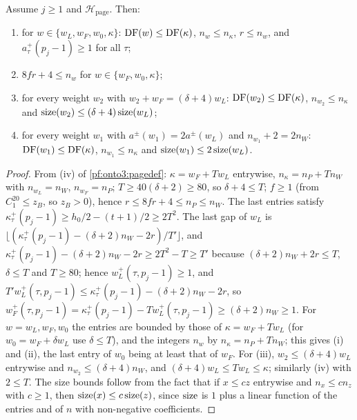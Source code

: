 \begin{lemma}\label{pf:onto3:below}
Assume $j\ge1$ and $\mathcal H_{\mathrm{page}}$. Then:
\begin{enumerate}[label=(\roman*)]
\item for $w\in\{w_L,w_F,w_0,\kappa\}$: $\operatorname{DF}(w)\le\operatorname{DF}(\kappa)$, $n_w\le n_\kappa$, $r\le n_w$, and
$a^+_\tau(p_j-1)\ge1$ for all $\tau$;
\item $8fr+4\le n_w$ for $w\in\{w_F,w_0,\kappa\}$;
\item for every weight $w_2$ with $w_2+w_F=(\delta+4)w_L$: $\operatorname{DF}(w_2)\le\operatorname{DF}(\kappa)$, $n_{w_2}\le n_\kappa$
and $\operatorname{size}(w_2)\le(\delta+4)\operatorname{size}(w_L)$;
\item for every weight $w_1$ with $a^\pm(w_1)=2a^\pm(w_L)$ and $n_{w_1}+2=2n_W$: $\operatorname{DF}(w_1)\le\operatorname{DF}(\kappa)$,
$n_{w_1}\le n_\kappa$ and $\operatorname{size}(w_1)\le2\operatorname{size}(w_L)$.
\end{enumerate}
\end{lemma}

\begin{proof}
From (iv) of \cref{pf:onto3:pagedef}: $\kappa=w_F+Tw_L$ entrywise, $n_\kappa=n_P+Tn_W$ with $n_{w_L}=n_W$, $n_{w_F}=n_P$;
$T\ge40(\delta+2)\ge80$, so $\delta+4\le T$; $f\ge1$ (from $C_1^{20}\le z_B$, so $z_B>0$), hence $r\le8fr+4\le n_P\le n_W$.
The last entries satisfy $\kappa^+_\tau(p_j-1)\ge h_0/2-(t+1)/2\ge2T^2$. The last gap of $w_L$ is
$\lfloor(\kappa^+_\tau(p_j-1)-(\delta+2)n_W-2r)/T'\rfloor$, and $\kappa^+_\tau(p_j-1)-(\delta+2)n_W-2r\ge2T^2-T\ge T'$
because $(\delta+2)n_W+2r\le T$, $\delta\le T$ and $T\ge80$; hence $w_L^+(\tau,p_j-1)\ge1$, and
$T'w_L^+(\tau,p_j-1)\le\kappa^+_\tau(p_j-1)-(\delta+2)n_W-2r$, so $w_F^+(\tau,p_j-1)=\kappa^+_\tau(p_j-1)-Tw_L^+(\tau,p_j-1)
\ge(\delta+2)n_W\ge1$. For $w=w_L,w_F,w_0$ the entries are bounded by those of $\kappa=w_F+Tw_L$ (for $w_0=w_F+\delta
w_L$ use $\delta\le T$), and the integers $n_w$ by $n_\kappa=n_P+Tn_W$; this gives (i) and (ii), the last entry of $w_0$
being at least that of $w_F$. For (iii), $w_2\le(\delta+4)w_L$ entrywise and $n_{w_2}\le(\delta+4)n_W$, and $(\delta+4)
w_L\le Tw_L\le\kappa$; similarly (iv) with $2\le T$. The size bounds follow from the fact that if $x\le cz$ entrywise and
$n_x\le cn_z$ with $c\ge1$, then $\operatorname{size}(x)\le c\operatorname{size}(z)$, since $\operatorname{size}$ is $1$ plus a linear
function of the entries and of $n$ with non-negative coefficients.
\end{proof}

